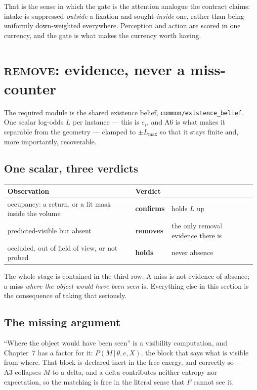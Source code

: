 \documentclass[11pt,a4paper]{report}
\newcommand{\given}{\,|\,}
\newcommand{\stage}[1]{\textsc{#1}}
\newcommand{\Remove}{\stage{remove}}
\begin{document}
That is the sense in which the gate is the attention analogue the contract claims: intake is
suppressed \emph{outside} a fixation and sought \emph{inside} one, rather than being uniformly
down-weighted everywhere. Perception and action are scored in one currency, and the gate is what
makes the currency worth having.

\section{\Remove: evidence, never a miss-counter}
\label{sec:remove}

The required module is the shared existence belief, \texttt{common/existence\_belief}. One scalar
log-odds $L$ per instance --- this is $e_i$, and A6 is what makes it separable from the geometry ---
clamped to $\pm L_{\max}$ so that it stays finite and, more importantly, recoverable.

\subsection{One scalar, three verdicts}

\begin{center}
\begin{tabular}{@{}p{6.4cm} l p{5.1cm}@{}}
\toprule
Observation & Verdict & \\
\midrule
occupancy: a return, or a lit mask inside the volume & \textbf{confirms} & holds $L$ up \\[2pt]
predicted-visible but absent & \textbf{removes} & the only removal evidence there is \\[2pt]
occluded, out of field of view, or not probed & \textbf{holds} & never absence \\
\bottomrule
\end{tabular}
\end{center}

\noindent
The whole stage is contained in the third row. A miss is not evidence of absence; a miss
\emph{where the object would have been seen} is. Everything else in this section is the consequence
of taking that seriously.

\subsection{The missing argument}
\label{sec:walls}

``Where the object would have been seen'' is a visibility computation, and Chapter~7 has a factor for
it: $P(M\given\theta,e,X)$, the block that says what is visible from where. That block is declared
inert in the free energy, and correctly so --- A3 collapses $M$ to a delta, and a delta contributes
neither entropy nor expectation, so the matching is free in the literal sense that $F$ cannot see it.
\end{document}
